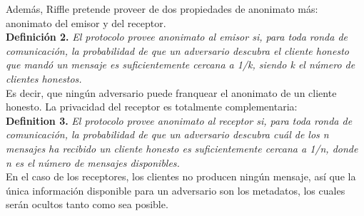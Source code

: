 Además, Riffle pretende proveer de dos propiedades de anonimato más: anonimato del emisor y del receptor. \\

\textbf{Definición 2.} \textit{El protocolo provee anonimato al emisor si, para toda ronda de comunicación, la probabilidad de que un adversario descubra el cliente honesto que mandó un mensaje es suficientemente cercana a 1/k, siendo k el número de clientes honestos.} \\

Es decir, que ningún adversario puede franquear el anonimato de un cliente honesto. La privacidad del receptor es totalmente complementaria: \\

\textbf{Definition 3.} \textit{El protocolo provee anonimato al receptor si, para toda ronda de comunicación, la probabilidad de que un adversario descubra cuál de los n mensajes ha recibido un cliente honesto es suficientemente cercana a 1/n, donde n es el número de mensajes disponibles.}  \\

En el caso de los receptores, los clientes no producen ningún mensaje, así que la única información disponible para un adversario son los metadatos, los cuales serán ocultos tanto como sea posible.
